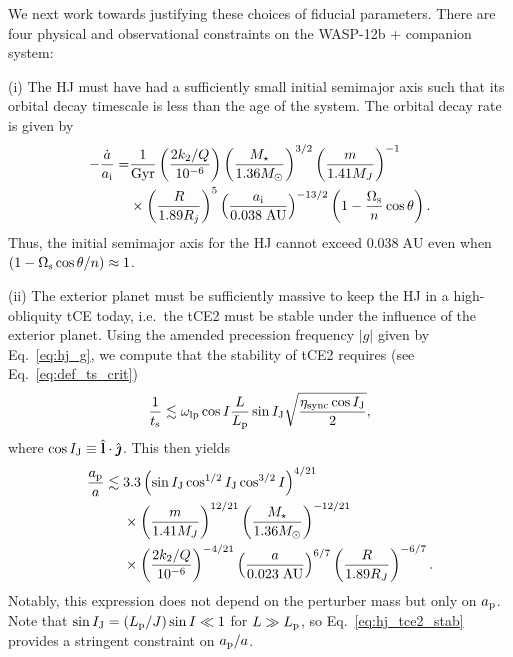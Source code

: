 \documentclass[
        fleqn,
        usenatbib,
        referee
    ]{mnras}
\newcommand*{\abs}[1]{\left|#1\right|}
\newcommand*{\p}[1]{\left(#1\right)}
\newcommand*{\uv}[1]{\hat{\boldsymbol{\mathbf{#1}}}}
\begin{document}
We next work towards justifying these choices of fiducial parameters. There are
four physical and observational constraints on the WASP-12b + companion system:

(i) The HJ must have had a sufficiently small initial semimajor axis such that
its orbital decay timescale is less than the age of the system. The orbital
decay rate is given by
\begin{align}
    -\frac{\dot{a}}{a_{\rm i}}
        =& \frac{1}{\mathrm{Gyr}}
            \p{\frac{2k_2/Q}{10^{-6}}}
            \p{\frac{M_\star}{1.36 M_{\odot}}}^{3/2}
            \p{\frac{m}{1.41M_J}}^{-1}\nonumber\\
        &\times \p{\frac{R}{1.89R_j}}^5
            \p{\frac{a_{\rm i}}{0.038\;\mathrm{AU}}}^{-13/2}
            \p{1 - \frac{\Omega_{\rm s}}{n}\cos \theta}.
            \label{eq:hj_adot}
\end{align}
Thus, the initial semimajor axis for the HJ cannot exceed $0.038\;\mathrm{AU}$
even when $\p{1 - \Omega_{\rm s}\cos \theta/n} \approx 1$.

(ii) The exterior planet must be sufficiently massive to keep the HJ in a
high-obliquity tCE today, i.e.\ the tCE2 must be stable under the influence of the
exterior planet. Using the amended precession frequency $\abs{g}$ given by
Eq.~\eqref{eq:hj_g}, we compute that the stability of tCE2 requires (see
Eq.~\ref{eq:def_ts_crit})
\begin{equation}
    \frac{1}{t_{\rm s}} \lesssim \omega_{\rm lp}\cos I \frac{L}{L_{\rm p}}
        \sin I_{\rm J} \sqrt{\frac{\eta_{\rm sync}\cos I_{\rm J}}{2}},
\end{equation}
where $\cos I_{\rm J} \equiv \uv{l} \cdot \uv{\jmath}$. This then yields
\begin{align}
    \frac{a_{\rm p}}{a}
        \lesssim{}& 3.3 \p{\sin I_{\rm J} \cos^{1/2} I_{\rm J}
            \cos^{3/2} I}^{4/21} \nonumber\\
        &\times
            \p{\frac{m}{1.41 M_J}}^{12/21}
            \p{\frac{M_\star}{1.36 M_{\odot}}}^{-12/21}\nonumber\\
        &\times \p{\frac{2k_2/Q}{10^{-6}}}^{-4/21}
            \p{\frac{a}{0.023\;\mathrm{AU}}}^{6/7}
            \p{\frac{R}{1.89 R_J}}^{-6/7}.\label{eq:hj_tce2_stab}
\end{align}
Notably, this expression does not depend on the perturber mass but only on
$a_{\rm p}$. Note that $\sin I_{\rm J} = \p{L_{\rm p} / J} \sin I \ll 1$ for $L
\gg L_{\rm p}$, so Eq.~\eqref{eq:hj_tce2_stab} provides a stringent constraint
on $a_{\rm p} / a$.
\end{document}
